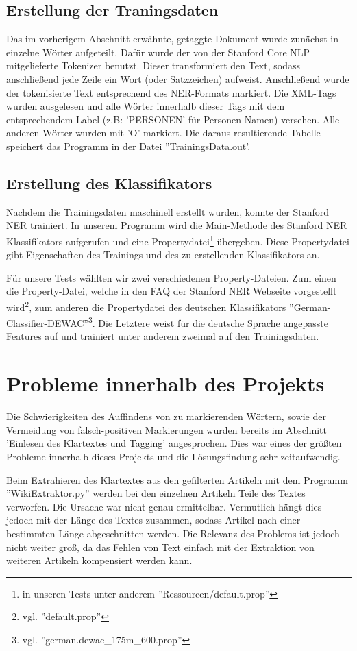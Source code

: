 \documentclass[a4paper]{article}
\begin{document}
	\subsection{Erstellung der Traningsdaten}
		Das im vorherigem Abschnitt erwähnte, getaggte Dokument wurde zunächst in einzelne Wörter aufgeteilt.
		Dafür wurde der von der Stanford Core NLP mitgelieferte Tokenizer benutzt.
		Dieser transformiert den Text, sodass anschließend jede Zeile ein Wort (oder Satzzeichen) aufweist.
		Anschließend wurde der tokenisierte Text entsprechend des NER-Formats markiert. 
		Die XML-Tags wurden ausgelesen und alle Wörter innerhalb dieser Tags mit dem entsprechendem Label (z.B: 'PERSONEN' für Personen-Namen) versehen. 
		Alle anderen Wörter wurden mit 'O' markiert.
		Die daraus resultierende Tabelle speichert das Programm in der Datei ''TrainingsData.out'.


	\subsection{Erstellung des Klassifikators}
		Nachdem die Trainingsdaten maschinell erstellt wurden, konnte der Stanford NER trainiert.
		In unserem Programm wird die Main-Methode des Stanford NER Klassifikators aufgerufen und eine Propertydatei\footnote{in unseren Tests unter anderem ''Ressourcen/default.prop''} übergeben.
		Diese Propertydatei gibt Eigenschaften des Trainings und des zu erstellenden Klassifikators an.

		Für unsere Tests wählten wir zwei verschiedenen Property-Dateien.
		Zum einen die Property-Datei, welche in den FAQ der Stanford NER Webseite vorgestellt wird\footnote{vgl. ''default.prop''}, zum anderen die Propertydatei des deutschen Klassifikators ''German-Classifier-DEWAC''\footnote{vgl. ''german.dewac\_175m\_600.prop''}.
		Die Letztere weist für die deutsche Sprache angepasste Features auf und trainiert unter anderem zweimal auf den Trainingsdaten.

\section{Probleme innerhalb des Projekts}
\label{Probleme}
	Die Schwierigkeiten des Auffindens von zu markierenden Wörtern, sowie der Vermeidung von falsch-positiven Markierungen wurden bereits im Abschnitt 'Einlesen des Klartextes und Tagging' angesprochen. Dies war eines der größten Probleme innerhalb dieses Projekts und die Lösungsfindung sehr zeitaufwendig.

	Beim Extrahieren des Klartextes aus den gefilterten Artikeln mit dem Programm ''WikiExtraktor.py'' werden bei den einzelnen Artikeln Teile des Textes verworfen.
	Die Ursache war nicht genau ermittelbar. Vermutlich hängt dies jedoch mit der Länge des Textes zusammen, sodass Artikel nach einer bestimmten Länge abgeschnitten werden. Die Relevanz des Problems ist jedoch nicht weiter groß, da das Fehlen von Text einfach mit der Extraktion von weiteren Artikeln kompensiert werden kann.
	
\end{document}
